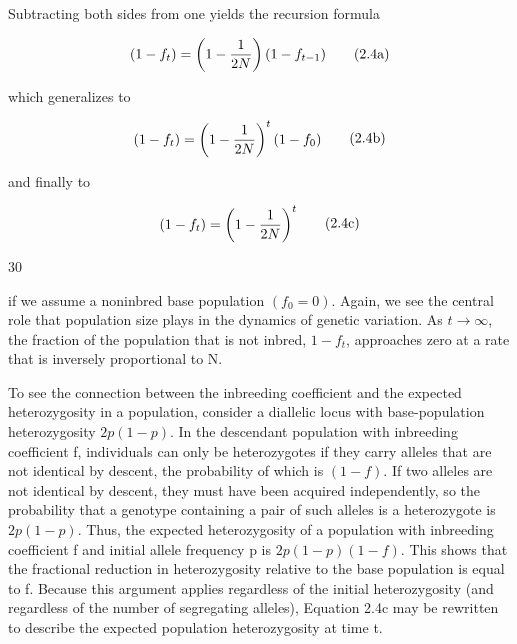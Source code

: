 \documentclass{article}
\begin{document}
Subtracting both sides from one yields the recursion formula

\begin{equation}
\begin{align*}(1-f_t)=\left(1-{1\over2N}\right)(1-f_{t-1})\end{align*}
\tag{2.4a}
\label{eq:2_4a}
\end{equation}

which generalizes to

\begin{equation}
\begin{align*}(1-f_t)=\left(1-{1\over2N}\right)^t(1-f_0)\end{align*}
\tag{2.4b}
\label{eq:2_4b}
\end{equation}

and finally to

\begin{equation}
\begin{align*}(1-f_t)=\left(1-{1\over2N}\right)^t\end{align*}
\tag{2.4c}
\label{eq:2_4c}
\end{equation}

30

if we assume a noninbred base population  $ (f_0 = 0) $. Again, we see the central role that population size plays in the dynamics of genetic variation. As  $ t \to \infty $, the fraction of the population that is not inbred,  $ 1 - f_t $, approaches zero at a rate that is inversely proportional to N.

To see the connection between the inbreeding coefficient and the expected heterozygosity in a population, consider a diallelic locus with base-population heterozygosity  $ 2p(1-p) $. In the descendant population with inbreeding coefficient f, individuals can only be heterozygotes if they carry alleles that are not identical by descent, the probability of which is  $ (1-f) $. If two alleles are not identical by descent, they must have been acquired independently, so the probability that a genotype containing a pair of such alleles is a heterozygote is  $ 2p(1-p) $. Thus, the expected heterozygosity of a population with inbreeding coefficient f and initial allele frequency p is  $ 2p(1-p)(1-f) $. This shows that the fractional reduction in heterozygosity relative to the base population is equal to f. Because this argument applies regardless of the initial heterozygosity (and regardless of the number of segregating alleles), Equation 2.4c may be rewritten to describe the expected population heterozygosity at time t.
\end{document}
